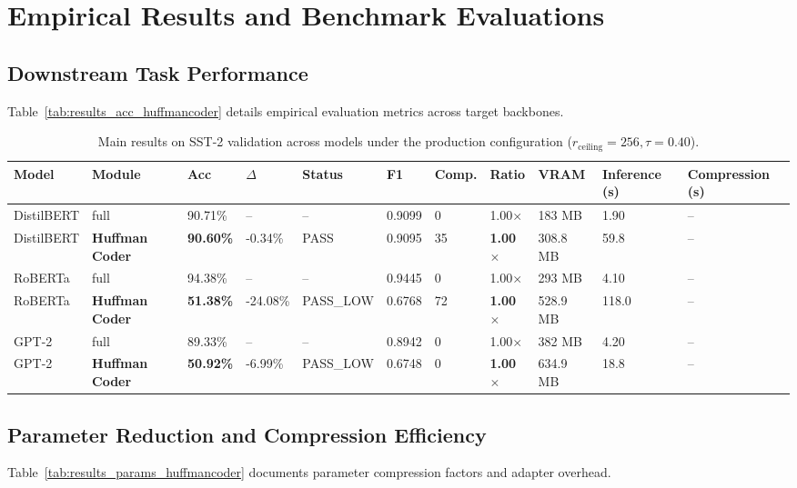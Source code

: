 \section{Empirical Results and Benchmark Evaluations}

\subsection{Downstream Task Performance}
Table~\ref{tab:results_acc_huffmancoder} details empirical evaluation metrics across target backbones.

\begin{table}[t]
\centering
\small
\begin{tabular}{lllllllllll}
\toprule
\textbf{Model} & \textbf{Module} & \textbf{Acc} & \textbf{$\Delta$} & \textbf{Status} & \textbf{F1} & \textbf{Comp.} & \textbf{Ratio} & \textbf{VRAM} & \textbf{Inference (s)} & \textbf{Compression (s)} \\
\midrule
DistilBERT & full & 90.71\% & -- & -- & 0.9099 & 0 & 1.00$\times$ & 183 MB & 1.90 & -- \\
DistilBERT & \textbf{Huffman Coder} & \textbf{90.60\%} & -0.34\% & PASS & 0.9095 & 35 & \textbf{1.00$\times$} & 308.8 MB & 59.8 & -- \\
RoBERTa & full & 94.38\% & -- & -- & 0.9445 & 0 & 1.00$\times$ & 293 MB & 4.10 & -- \\
RoBERTa & \textbf{Huffman Coder} & \textbf{51.38\%} & -24.08\% & PASS_LOW & 0.6768 & 72 & \textbf{1.00$\times$} & 528.9 MB & 118.0 & -- \\
GPT-2 & full & 89.33\% & -- & -- & 0.8942 & 0 & 1.00$\times$ & 382 MB & 4.20 & -- \\
GPT-2 & \textbf{Huffman Coder} & \textbf{50.92\%} & -6.99\% & PASS_LOW & 0.6748 & 0 & \textbf{1.00$\times$} & 634.9 MB & 18.8 & -- \\
\bottomrule
\end{tabular}
\caption{Main results on SST-2 validation across models under the production configuration ($r_{\mathrm{ceiling}}=256, \tau=0.40$).}
\label{tab:main_sst2}
\end{table}

\subsection{Parameter Reduction and Compression Efficiency}
Table~\ref{tab:results_params_huffmancoder} documents parameter compression factors and adapter overhead.

